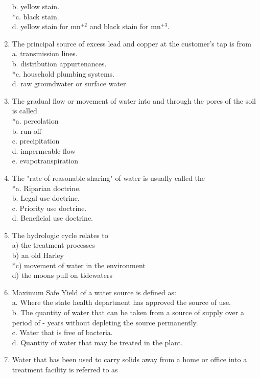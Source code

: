 \begin{enumerate}
b. yellow stain.\\
*c. black stain.\\
d. yellow stain for $\mathrm{mn}^{+2}$ and black stain for $\mathrm{mn}^{+3}$.\\
\item The principal source of excess lead and copper at the customer's tap is from\\
a. transmission lines.\\
b. distribution appurtenances.\\
*c. household plumbing systems.\\
d. raw groundwater or surface water.
\item The gradual flow or movement of water into and through the pores of the soil is called\\
*a. percolation\\
b. run-off\\
c. precipitation\\
d. impermeable flow\\
e. evapotranspiration\\
\item The "rate of reasonable sharing" of water is usually called the\\
*a. Riparian doctrine.\\
b. Legal use doctrine.\\
c. Priority use doctrine.\\
d. Beneficial use doctrine.\\
\item The hydrologic cycle relates to\\
a) the treatment processes\\
b) an old Harley\\
*c) movement of water in the environment\\
d) the moons pull on tidewaters\\
\item Maximum Safe Yield of a water source is defined as:\\
a. Where the state health department has approved the source of use.\\
b. The quantity of water that can be taken from a source of supply over a period of - years without depleting the source permanently.\\
c. Water that is free of bacteria.\\
d. Quantity of water that may be treated in the plant.
\item Water that has been used to carry solids away from a home or office into a treatment facility is referred to as\\

\end{enumerate}
